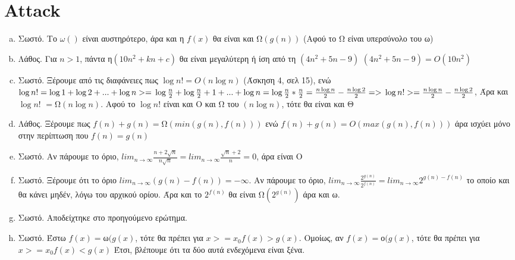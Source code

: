 \documentclass{article}
\begin{document}
\section*{\textlatin{Attack}}
\begin{enumerate}[(a)]%
\item
Σωστό. Το $\omega{()}$ είναι αυστηρότερο, άρα και η $f(x)$ θα είναι και  Ω$(g(n))$ (Αφού το Ω είναι υπερσύνολο του ω)
\item
Λάθος. Για $n > 1$, πάντα η$(10n^2 + kn + c)$ θα είναι μεγαλύτερη ή ίση από τη $(4n^2 + 5n - 9)$ $(4n^2 + 5n - 9) = O(10n^2)$ 
\item
Σωστό. Ξέρουμε από τις διαφάνειες πως $\log{n!} = O(n\log{n})$ (Άσκηση 4, σελ 15), ενώ $\log{n!} = \log{1} + \log{2} + ... + \log{n} >= \\\\
 \log{\frac{n}{2}} + \log{\frac{n}{2}+1} + ... + \log{n} = \log{\frac{n}{2}}*\frac{n}{2} = \frac{n\log{n}}{2}-\frac{n\log{2}}{2} =>\\\\
\log{n!} >=  \frac{n\log{n}}{2}-\frac{n\log{2}}{2}$, Άρα και $\log{n!}$ $=$Ω$(n\log{n})$. Αφού  το $\log{n!}$ είναι και Ο και Ω του $(n\log{n})$, τότε θα είναι και Θ
\item
Λάθος. Ξέρουμε πως $f(n) + g(n) = $Ω$(min(g(n),f(n)))$ ενώ $f(n) + g(n) = O(max(g(n),f(n)))$ άρα ισχύει μόνο στην περίπτωση που $f(n) = g(n)$
\item
Σωστό. Αν πάρουμε το όριο, $ lim_{n\to\infty} \frac{n+2\sqrt{n}}{n\sqrt{n}} = lim_{n\to\infty} \frac{\sqrt{n}+2}{n} = 0$, άρα είναι O
\item
Σωστό. Ξέρουμε ότι το όριο $ lim_{n\to\infty} (g(n) - f(n)) = -\infty$. Αν πάρουμε το όριο, $ lim_{n\to\infty} \frac{2^{g(n)}}{2^{f(n)}} =  lim_{n\to\infty} 2^{g(n)-f(n)}$ το οποίο και θα κάνει μηδέν, λόγω του αρχικού ορίου. Άρα και το $2^{f(n)}$ θα είναι Ω$(2^{g(n)})$ άρα και ω.
\item
Σωστό. Αποδείχτηκε στο προηγούμενο ερώτημα.
\item
Σωστό. Έστω $f(x) = $ω$(g(x)$, τότε θα πρέπει για $x>=x_0 f(x) > g(x)$. Ομοίως, αν $f(x) = $ο$(g(x)$, τότε θα πρέπει για $x>=x_0 f(x) < g(x)$ Έτσι, βλέπουμε ότι τα δύο αυτά ενδεχόμενα είναι ξένα.

\end{enumerate}
\end{document}
